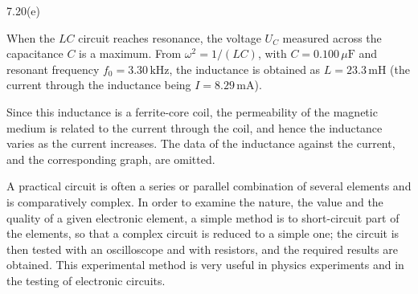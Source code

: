 \begin{figbox}{7.20(e)}
\end{figbox}

When the $LC$ circuit reaches resonance, the voltage $U_C$ measured across the capacitance $C$ is a maximum. From $\omega^2=1/(LC)$, with $C=0.100\,\mu\mathrm{F}$ and resonant frequency $f_0=3.30\,\mathrm{kHz}$, the inductance is obtained as
 \(L=23.3\,\mathrm{mH}\) (the current through the inductance being \(I=8.29\,\mathrm{mA}\)).



Since this inductance is a ferrite-core coil, the permeability of the magnetic medium is related to the current through the coil, and hence the inductance varies as the current increases. The data of the inductance against the current, and the corresponding graph, are omitted.

\begin{commentary}
A practical circuit is often a series or parallel combination of several elements and is comparatively complex. In order to examine the nature, the value and the quality of a given electronic element, a simple method is to short-circuit part of the elements, so that a complex circuit is reduced to a simple one; the circuit is then tested with an oscilloscope and with resistors, and the required results are obtained. This experimental method is very useful in physics experiments and in the testing of electronic circuits.
\end{commentary}

